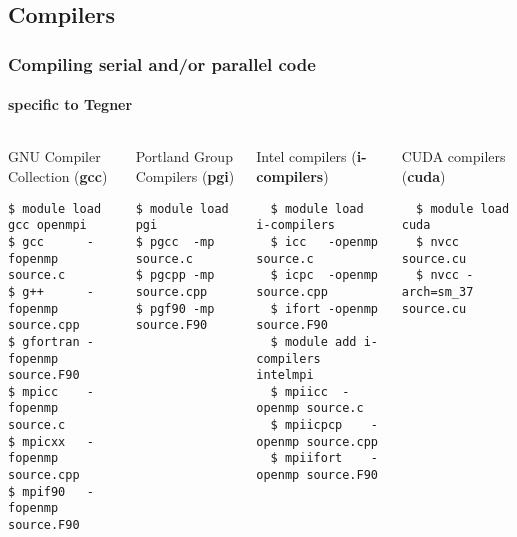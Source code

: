 \subsection{Compilers}
\begin{frame}[fragile]
\frametitle{Compiling serial and/or parallel code}
\framesubtitle{specific to \alert{Tegner}}

\begin{columns}[t]
\begin{exampleblock}{GNU Compiler Collection (\textbf{gcc})}
  \scriptsize
  \begin{verbatim}
$ module load 	gcc openmpi
$ gcc	   -fopenmp source.c
$ g++	   -fopenmp source.cpp
$ gfortran -fopenmp source.F90
$ mpicc	   -fopenmp source.c
$ mpicxx   -fopenmp source.cpp
$ mpif90   -fopenmp source.F90
  \end{verbatim}
  \end{exampleblock}

  \begin{exampleblock}{Portland Group Compilers (\textbf{pgi}) }
  \scriptsize
  \begin{verbatim}
$ module load 	pgi
$ pgcc  -mp source.c
$ pgcpp -mp source.cpp
$ pgf90 -mp source.F90
  \end{verbatim}
  \end{exampleblock}


  \begin{exampleblock}{Intel compilers (\textbf{i-compilers})}
  \scriptsize
  \begin{verbatim}
  $ module load i-compilers
  $ icc   -openmp source.c	
  $ icpc  -openmp source.cpp
  $ ifort -openmp source.F90
  $ module add i-compilers intelmpi
  $ mpiicc 	-openmp source.c
  $ mpiicpcp 	-openmp source.cpp
  $ mpiifort 	-openmp source.F90
  \end{verbatim}
  \end{exampleblock}

  \begin{exampleblock}{CUDA compilers (\textbf{cuda})}
  \scriptsize
  \begin{verbatim}
  $ module load cuda
  $ nvcc source.cu
  $ nvcc -arch=sm_37  source.cu
  \end{verbatim}
  \end{exampleblock}

\end{columns}
\end{frame}


